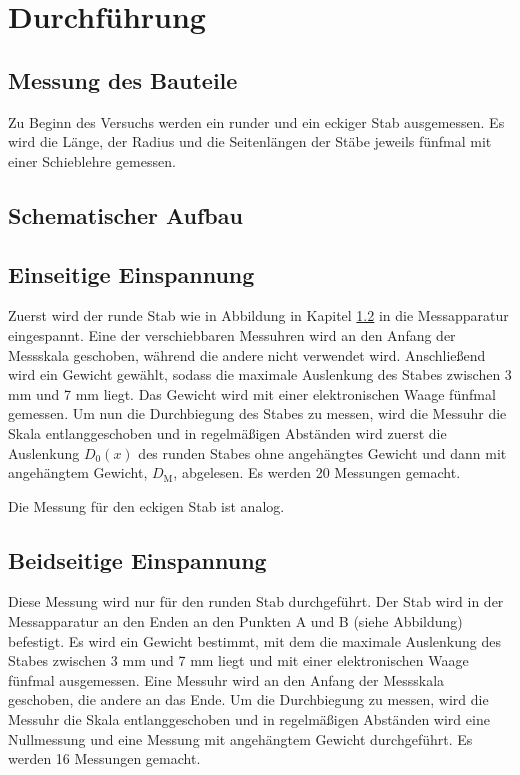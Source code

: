 \section{Durchführung} \label{sec:durchführung}

\subsection{Messung des Bauteile} \label{sec:bauteile}

    Zu Beginn des Versuchs werden ein runder und ein eckiger Stab ausgemessen.
    Es wird die Länge, der Radius und die Seitenlängen der Stäbe jeweils fünfmal mit 
    einer Schieblehre gemessen.

\subsection{Schematischer Aufbau} \label{sec:aufbau} %

\subsection{Einseitige Einspannung}

    Zuerst wird der runde Stab wie in Abbildung in Kapitel \ref{sec:aufbau} in die Messapparatur eingespannt. %
    Eine der verschiebbaren Messuhren wird an den Anfang der Messskala geschoben, während die andere
    nicht verwendet wird.
    Anschließend wird ein Gewicht gewählt, sodass die maximale Auslenkung des Stabes zwischen 3 mm und 7 mm liegt.
    Das Gewicht wird mit einer elektronischen Waage fünfmal gemessen.
    Um nun die Durchbiegung des Stabes zu messen, wird die Messuhr die Skala entlanggeschoben und in 
    regelmäßigen Abständen wird zuerst die Auslenkung $D_0(x)$ des runden Stabes ohne angehängtes Gewicht 
    und dann mit angehängtem Gewicht, $D_\text{M}$, abgelesen.
    Es werden 20 Messungen gemacht.

    Die Messung für den eckigen Stab ist analog.

\subsection{Beidseitige Einspannung}

    Diese Messung wird nur für den runden Stab durchgeführt.
    Der Stab wird in der Messapparatur an den Enden an den Punkten A und B (siehe Abbildung) %
    befestigt.
    Es wird ein Gewicht bestimmt, mit dem die maximale Auslenkung des Stabes zwischen 3 mm und 7 mm liegt 
    und mit einer elektronischen Waage fünfmal ausgemessen.
    Eine Messuhr wird an den Anfang der Messskala geschoben, die andere an das Ende.
    Um die Durchbiegung zu messen, wird die Messuhr die Skala entlanggeschoben und in regelmäßigen Abständen
    wird eine Nullmessung und eine Messung mit angehängtem Gewicht durchgeführt.
    Es werden 16 Messungen gemacht.



